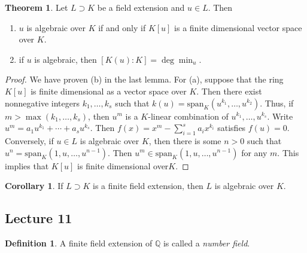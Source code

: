 \documentclass[10pt,letterpaper,cm]{nupset}
\theoremstyle{definition}
\newtheorem*{definition}{Definition}
\newtheorem{theorem}{Theorem}
\newtheorem{corollary}{Corollary}
\newcommand{\Q}{\mathbb Q}
\newcommand{\1}{\mathbf{1}}
\newcommand{\0}{\vec 0}
\begin{document}
\begin{theorem}
Let $L \supset K$ be a field extension and $u\in L$.  Then 
\begin{enumerate}[label=(\alph*)]
\item $u$ is algebraic over $K$ if and only if $K[u]$ is a finite dimensional vector space over $K$.
\item if $u$ is algebraic, then $[K(u) : K] = \deg{\min_u}$. 
\end{enumerate}
\end{theorem}
\begin{proof}
We have proven (b) in the last lemma. For (a), suppose that the ring $K[u]$ is finite dimensional as a vector space over $K$. Then there exist nonnegative integers $k_1, \ldots, k_s$ such that $k(u) = \text{span}_K(u^{k_1}, \ldots, u^{k_2})$. Thus, if $m > \max(k_1, \ldots, k_s)$, then $u^m$ is a $K$-linear combination of $u^{k_1}, \ldots, u^{k_s}$. Write $u^m = a_1u^{k_1} + \cdots + a_s u^{k_s}$. Then $f(x) = x^m - \sum_{i=1}^s a_i x^{k_i}$ satisfies  $f(u) = 0$. Conversely, if $u\in L$ is algebraic over $K$, then there is some $n>0$ such that $u^n = \text{span}_K(1, u, \ldots, u^{n-1})$. Then $u^m \in \text{span}_K(1, u, \ldots, u^{n-1})$ for any $m$. This implies that $K[u]$ is finite dimensional over$K$.
\end{proof}

\begin{corollary}
If $L\supset K$ is a finite field extension, then $L$ is algebraic over $K$.
\end{corollary}

\subsection{Lecture 11}

\begin{definition}
A finite field extension of $\Q$ is called a \textit{number field}.
\end{definition}
\end{document}
